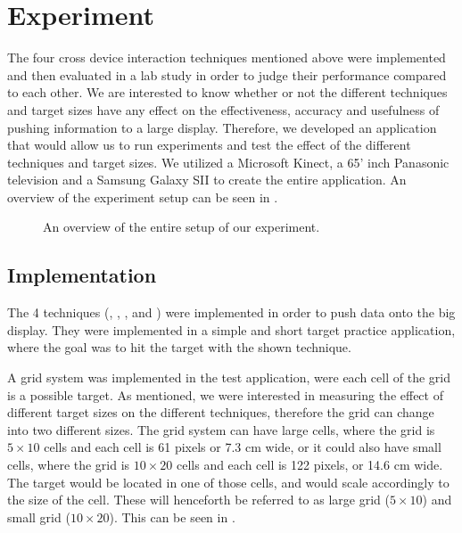 \section{Experiment} \label{sec:experiment}
The four cross device interaction techniques mentioned above were implemented and then evaluated in a lab study in order to judge their performance compared to each other. 
We are interested to know whether or not the different techniques and target sizes have any effect on the effectiveness, accuracy and usefulness of pushing information to a large display. Therefore, we developed an application that would allow us to run experiments and test the effect of the different techniques and target sizes. 
We utilized a Microsoft Kinect, a 65' inch Panasonic television and a Samsung Galaxy SII to create the entire application. 
An overview of the experiment setup can be seen in . 

\begin{figure}[H]
	\centering
	\caption{
		\protect An overview of the entire setup of our experiment.
	}
	\label{fig:entireSetup}
\end{figure}

\subsection{Implementation}

The 4 techniques (\swipe, \tilt, \throw, and \pinch) were implemented in order to push data onto the big display. 
They were implemented in a simple and short target practice application, where the goal was to hit the target with the shown technique. 

A grid system was implemented in the test application, were each cell of the grid is a possible target. 
As mentioned, we were interested in measuring the effect of different target sizes on the different techniques, therefore the grid can change into two different sizes. 
The grid system can have large cells, where the grid is $5 \times 10$ cells and each cell is 61 pixels or 7.3 cm wide, or it could also have small cells, where the grid is $10 \times 20$ cells and each cell is 122 pixels, or 14.6 cm wide. 
The target would be located in one of those cells, and would scale accordingly to the size of the cell.
These will henceforth be referred to as large grid ($5 \times 10$) and small grid ($10 \times 20$). This can be seen in . 

